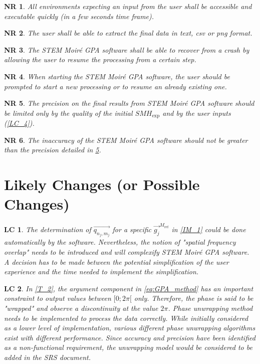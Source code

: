 \documentclass[12pt]{article}
\newcommand{\progname}{STEM Moir{\'e} GPA}
\newtheorem{NR}{NR}
\newtheorem{LC}{LC}
\begin{document}
\begin{NR}
\label{NR_4} 
\normalfont All environments expecting an input from the user shall be accessible and executable quickly (in a few seconds time frame).
\end{NR}

\begin{NR}
\label{NR_5} 
\normalfont The user shall be able to extract the final data in text, csv or png format.
\end{NR}

\begin{NR}
\label{NR_6} 
\normalfont The \progname{} software shall be able to recover from a crash by allowing the user to resume the processing from a certain step.
\end{NR}

\begin{NR}
\label{NR_7} 
\normalfont When starting the \progname{} software, the user should be prompted to start a new processing or to resume an already existing one.
\end{NR}

\begin{NR}
\label{NR_8} 
\normalfont The precision on the final results from \progname{} software should be limited only by the quality of the initial $SMH_{\text{exp}}$ and by the user inputs (\cref{LC_4}).
\end{NR}

\begin{NR}
\label{NR_9} 
\normalfont The inaccuracy of the \progname{} software should not be greater than the precision detailed in \cref{NR_8}.
\end{NR}

\section{Likely Changes (or Possible Changes)}    

\begin{LC}
\label{LC_1}
\normalfont The determination of $\overrightarrow{q_{n_j,m_j}}$ for a specific $\overrightarrow{g_j}^{M_{\text{ref}}}$ in \cref{IM_1} could be done automatically by the software. Nevertheless, the notion of "spatial frequency overlap" needs to be introduced and will complexify \progname{} software. A decision has to be made between the potential simplification of the user experience and the time needed to implement the simplification.
\end{LC}

\begin{LC}
\label{LC_2}
\normalfont In \cref{T_2}, the argument component in \cref{eq:GPA_method} has an important constraint to output values between $[0;2\pi[$ only. Therefore, the phase is said to be "wrapped" and observe a discontinuity at the value $2\pi$. Phase unwrapping method needs to be implemented to process the data correctly. While initially considered as a lower level of implementation, various different phase unwrapping algorithms exist with different performance. Since accuracy and precision have been identified as a non-functional requirement, the unwrapping model would be considered to be added in the SRS document. 
\end{LC}
\end{document}
